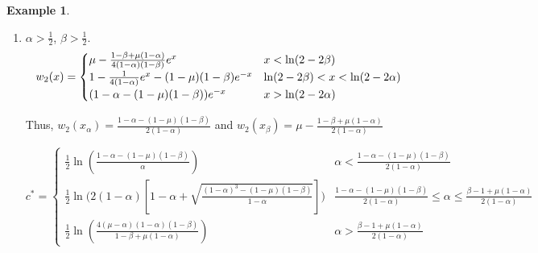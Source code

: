 \documentclass[11pt]{article}
\theoremstyle{definition}
\newtheorem{ex}[thm]{Example}
\numberwithin{equation}{section}
\numberwithin{thm}{section}
\renewcommand{\a}{\alpha}
\renewcommand{\b}{\beta}
\newcommand{\m}{\mu}
\begin{document}
\begin{ex}
\begin{enumerate}[{Case} 1.]
\item $\a>\frac{1}{2}$, $\b>\frac{1}{2}$.
\begin{equation}
w_2(x) = \begin{cases}
\m \Conecasethree e^x  & x < \ln(2-2\b) \\
1 - \Ctwocasetwo e^x - \Cthreecasetwo e^{-x} & \ln(2-2\b) < x < \ln(2-2\a) \\
(\Cfourcasethree) e^{-x} & x > \ln(2-2\a)
\end{cases}
\end{equation}

Thus, $w_2(x_\a)=\frac{1-\a-(1-\m)(1-\b)}{2(1-\a)}$ and $w_2(x_\b)=\m - \frac{1-\b+\m(1-\a)}{2(1-\a)}$

\begin{equation}
c^* = \begin{cases}
\frac{1}{2} \ln \left( \frac{1-\a-(1-\m)(1-\b)}{\a} \right) & \a<\frac{1-\a-(1-\m)(1-\b)}{2(1-\a)} \\
\frac{1}{2} \ln \Big( 2(1-\a)\left[1-\a + \sqrt{\frac{(1-\a)^3-(1-\m)(1-\b) }{1-\a}}\right] \Big) & \frac{1-\a-(1-\m)(1-\b)}{2(1-\a)}\leq\a\leq\frac{\b-1+\m(1-\a)}{2(1-\a)} \\
\frac{1}{2} \ln \left( \frac{4(\m-\a)(1-\a)(1-\b)}{1-\b+\m(1-\a)}\right) & \a>\frac{\b-1+\m(1-\a)}{2(1-\a)}
\end{cases}
\end{equation}

\end{enumerate}


\end{ex}
\end{document}
